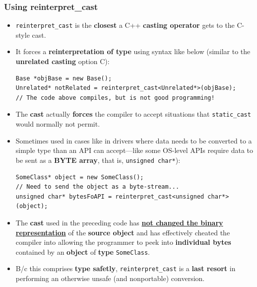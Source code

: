 \documentclass[10pt]{article}
\begin{document}
\subsubsection{Using reinterpret\_cast}
\begin{itemize}
	\item \verb|reinterpret_cast| is the \textbf{closest} a C++ \textbf{casting operator} gets to the C-style cast.

	\item It forces a \textbf{reinterpretation of type} using syntax like below (similar to the \textbf{unrelated casting} option C):
		\begin{verbatim}
Base *objBase = new Base();
Unrelated* notRelated = reinterpret_cast<Unrelated*>(objBase);
// The code above compiles, but is not good programming!
		\end{verbatim}

	\item The \textbf{cast} actually \textbf{forces} the compiler to accept situations that \verb|static_cast| would normally not permit.

	\item Sometimes used in cases like in drivers where data needs to be converted to a simple type than an API can accept---like some OS-level APIs require data to be sent as a \textbf{BYTE array}, that is, \verb|unsigned char*|):

		\begin{verbatim}
SomeClass* object = new SomeClass();
// Need to send the object as a byte-stream...
unsigned char* bytesFoAPI = reinterpret_cast<unsigned char*>(object);
		\end{verbatim}

	\item  The \textbf{cast} used in the preceding code has \textbf{\underline{not changed the binary representation}} of the \textbf{source object} and has effectively cheated the compiler into allowing the programmer to peek into \textbf{individual bytes} contained by an \textbf{object} of \textbf{type} \verb|SomeClass|.

	\item B/c this comprises \textbf{type safetly}, \verb|reinterpret_cast| is a \textbf{last resort} in performing an otherwise unsafe (and nonportable) conversion.
\end{itemize}

\newpage
\end{document}
